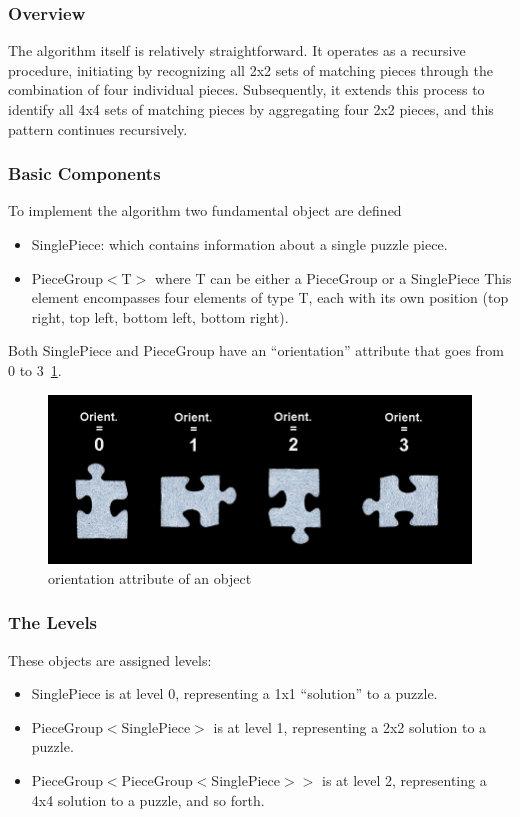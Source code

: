 \documentclass{article}
\begin{document}
\subsubsection{Overview}
The algorithm itself is relatively straightforward.
It operates as a recursive procedure, initiating by recognizing all 2x2
sets of matching pieces through the combination of four individual pieces.
Subsequently, it extends this process to identify all 4x4 sets of matching pieces
by aggregating four 2x2 pieces, and this pattern continues recursively.

\subsubsection{Basic Components}
To implement the algorithm two fundamental object are defined
\begin{itemize}
  \item SinglePiece: which contains information about a single puzzle piece.
  \item PieceGroup\(<\)T\(>\) where T can be either a PieceGroup or a SinglePiece\newline
  This element encompasses four elements of type T, each with its own position (top right, top left, bottom left, bottom right).
\end{itemize}
Both SinglePiece and PieceGroup have an ``orientation'' attribute that goes from 0 to 3~\cref{fig:orientation}.
\begin{figure}[H]
  \caption{orientation attribute of an object}\label{fig:orientation}
  \centering
  \includegraphics[height=0.3\textwidth]{pictures/orientation.png}
\end{figure}

\subsubsection{The Levels}

These objects are assigned levels:
\begin{itemize}
\item SinglePiece is at level 0, representing a 1x1 ``solution'' to a puzzle.
\item PieceGroup\(<\)SinglePiece\(>\) is at level 1, representing a 2x2 solution to a puzzle.
\item PieceGroup\(<\)PieceGroup\(<\)SinglePiece\(>>\) is at level 2, representing a 4x4 solution to a puzzle, and so forth.
\end{itemize}
\end{document}
